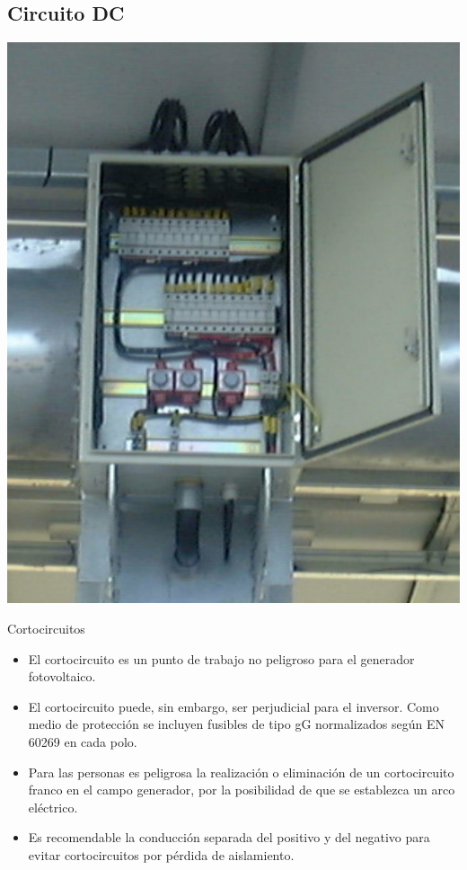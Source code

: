 \documentclass[xcolor={usenames,svgnames,dvipsnames}]{beamer}
\begin{document}
\subsection{Circuito DC}
\label{sec:org3256a8a}
\begin{frame}[label={sec:org9afa06e}]{}
\begin{center}
\includegraphics[height=0.8\textheight]{../figs/CajaProteccionesPhotocampa.pdf}
\end{center}
\end{frame}


\begin{frame}[label={sec:orgd2d468a}]{Cortocircuitos}
\begin{itemize}
\item El \alert{cortocircuito} es un punto de trabajo \alert{no peligroso para el
generador fotovoltaico}.

\item El cortocircuito puede, sin embargo, ser \alert{perjudicial para el
inversor}. Como medio de protección se incluyen fusibles de tipo gG
normalizados según EN 60269 en cada polo.

\item Para las personas es \alert{peligrosa la realización o eliminación de un
cortocircuito franco en el campo generador}, por la posibilidad de
que se establezca un arco eléctrico.

\item Es recomendable la \alert{conducción separada} del positivo y del negativo
para evitar cortocircuitos por pérdida de aislamiento.
\end{itemize}
\end{frame}
\end{document}
